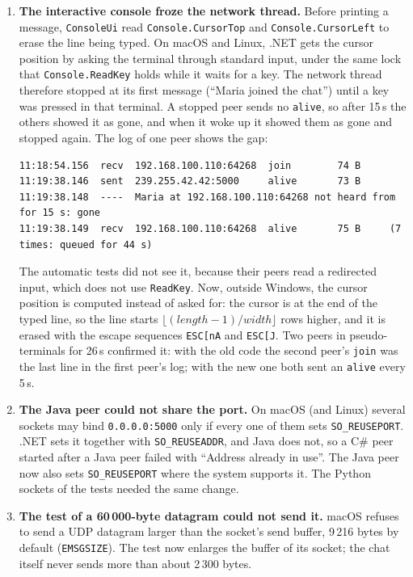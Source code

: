 \documentclass[11pt,a4paper]{article}
\newcommand{\code}[1]{{\frenchspacing\texttt{#1}}}
\begin{document}
\begin{enumerate}
\item \textbf{The interactive console froze the network thread.} Before printing a message,
  \code{ConsoleUi} read \code{Console.CursorTop} and \code{Console.CursorLeft} to erase the line being
  typed. On macOS and Linux, .NET gets the cursor position by asking the terminal through standard
  input, under the same lock that \code{Console.ReadKey} holds while it waits for a key. The network
  thread therefore stopped at its first message (``Maria joined the chat'') until a key was pressed
  in that terminal. A stopped peer sends no \code{alive}, so after 15\,s the others showed it as gone,
  and when it woke up it showed them as gone and stopped again. The log of one peer shows the gap:
\begin{lstlisting}
11:18:54.156  recv  192.168.100.110:64268  join        74 B
11:19:38.146  sent  239.255.42.42:5000     alive       73 B
11:19:38.148  ----  Maria at 192.168.100.110:64268 not heard from for 15 s: gone
11:19:38.149  recv  192.168.100.110:64268  alive       75 B     (7 times: queued for 44 s)
\end{lstlisting}
  The automatic tests did not see it, because their peers read a redirected input, which does not
  use \code{ReadKey}. Now, outside Windows, the cursor position is computed instead of asked for:
  the cursor is at the end of the typed line, so the line starts $\lfloor(\mathit{length}-1)/
  \mathit{width}\rfloor$ rows higher, and it is erased with the escape sequences \code{ESC[nA} and
  \code{ESC[J}. Two peers in pseudo-terminals for 26\,s confirmed it: with the old code the second
  peer's \code{join} was the last line in the first peer's log; with the new one both sent an
  \code{alive} every 5\,s.
\item \textbf{The Java peer could not share the port.} On macOS (and Linux) several sockets may bind
  \code{0.0.0.0:5000} only if every one of them sets \code{SO\_REUSEPORT}. .NET sets it together with
  \code{SO\_REUSEADDR}, and Java does not, so a C\# peer started after a Java peer failed with
  ``Address already in use''. The Java peer now also sets \code{SO\_REUSEPORT} where the system
  supports it. The Python sockets of the tests needed the same change.
\item \textbf{The test of a 60\,000-byte datagram could not send it.} macOS refuses to send a UDP
  datagram larger than the socket's send buffer, 9\,216 bytes by default (\code{EMSGSIZE}). The
  test now enlarges the buffer of its socket; the chat itself never sends more than about
  2\,300 bytes.
\end{enumerate}
\end{document}
